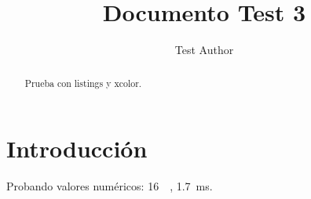 \documentclass[conference,a4paper]{IEEEtran}
\begin{document}
\title{Documento Test 3}
\author{Test Author}
\maketitle

\begin{abstract}
Prueba con listings y xcolor.
\end{abstract}

\section{Introducción}
Probando valores numéricos: \SI{16}{\giga\byte}, \SI{1.7}{\milli\second}.
\end{document}
